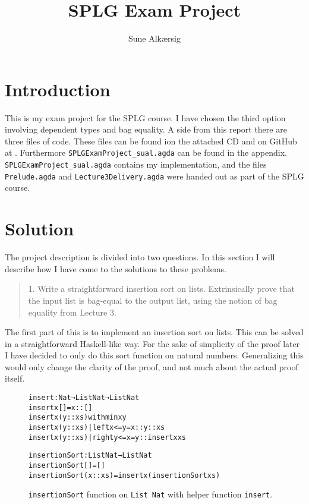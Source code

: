 \documentclass[oribibl, fleqn]{llncs}
\begin{document}
\newcommand{\justif}[2]{&{#1}&\text{#2}}
\mainmatter
\title{SPLG Exam Project}
\author{Sune Alkærsig \\
}
\newcommand{\counting}{\stepcounter{index}\theindex}


\maketitle
\section{Introduction}
This is my exam project for the SPLG course. I have chosen the third option involving dependent types and bag equality. A side from this report there are three files of code. These files can be found ion the attached CD and on GitHub at . Furthermore \texttt{SPLGExamProject\_sual.agda} can be found in the appendix. \texttt{SPLGExamProject\_sual.agda} contains my implementation, and the files \texttt{Prelude.agda} and \texttt{Lecture3Delivery.agda} were handed out as part of the SPLG course.

\section{Solution}
The project description is divided into two questions. In this section I will describe how I have come to the solutions to these problems.

\begin{quote}
1. Write a straightforward insertion sort on lists. Extrinsically prove that the input list is bag-equal to the output list, using the notion of bag equality from Lecture 3.
\end{quote}

The first part of this is to implement an insertion sort on lists. This can be solved in a straightforward Haskell-like way. For the sake of simplicity of the proof later I have decided to only do this sort function on natural numbers. Generalizing this would only change the clarity of the proof, and not much about the actual proof itself.

\begin{figure}
\begin{alltt}
insert : Nat → List Nat → List Nat
insert x [] = x :: []
insert x (y :: xs) with min x y
insert x (y :: xs) | left  x<=y = x :: y :: xs
insert x (y :: xs) | right y<=x = y :: insert x xs

insertionSort : List Nat → List Nat
insertionSort [] = []
insertionSort (x :: xs) = insert x (insertionSort xs)
\end{alltt}
\caption{\texttt{insertionSort} function on \texttt{List Nat} with helper function \texttt{insert}.}
\label{fig:insertionSort}
\end{figure}
\end{document}
